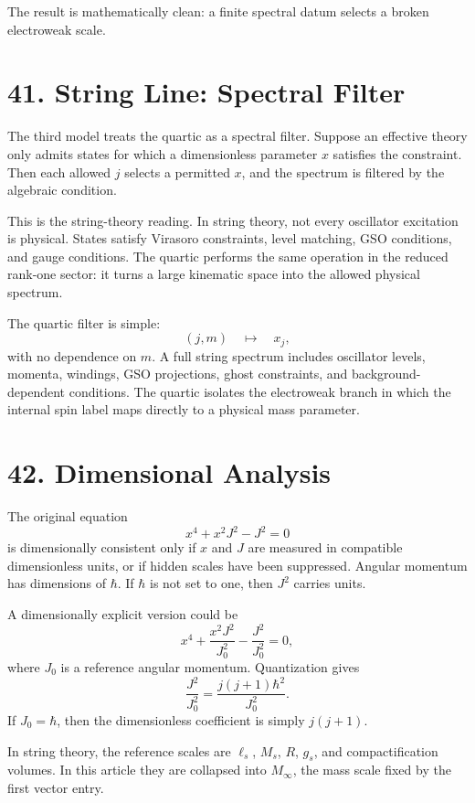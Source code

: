 \documentclass[11pt]{article}
\newcommand{\hb}{\hbar}
\begin{document}
The result is mathematically clean: a finite spectral datum selects a broken electroweak scale.


\section*{41. String Line: Spectral Filter}

The third model treats the quartic as a spectral filter. Suppose an effective theory only admits states for which a dimensionless parameter \(x\) satisfies the constraint. Then each allowed \(j\) selects a permitted \(x\), and the spectrum is filtered by the algebraic condition.

This is the string-theory reading. In string theory, not every oscillator excitation is physical. States satisfy Virasoro constraints, level matching, GSO conditions, and gauge conditions. The quartic performs the same operation in the reduced rank-one sector: it turns a large kinematic space into the allowed physical spectrum.

The quartic filter is simple:
\[
        (j,m)\quad\mapsto\quad x_j,
\]
with no dependence on \(m\). A full string spectrum includes oscillator levels, momenta, windings, GSO projections, ghost constraints, and background-dependent conditions. The quartic isolates the electroweak branch in which the internal spin label maps directly to a physical mass parameter.


\section*{42. Dimensional Analysis}

The original equation
\[
        x^4+x^2J^2-J^2=0
\]
is dimensionally consistent only if \(x\) and \(J\) are measured in compatible dimensionless units, or if hidden scales have been suppressed. Angular momentum has dimensions of \(\hb\). If \(\hb\) is not set to one, then \(J^2\) carries units.

A dimensionally explicit version could be
\[
        x^4+\frac{x^2J^2}{J_0^2}-\frac{J^2}{J_0^2}=0,
\]
where \(J_0\) is a reference angular momentum. Quantization gives
\[
        \frac{J^2}{J_0^2}
        =
        \frac{j(j+1)\hb^2}{J_0^2}.
\]
If \(J_0=\hb\), then the dimensionless coefficient is simply \(j(j+1)\).

In string theory, the reference scales are \(\ell_s\), \(M_s\), \(R\), \(g_s\), and compactification volumes. In this article they are collapsed into \(M_\infty\), the mass scale fixed by the first vector entry.
\end{document}
